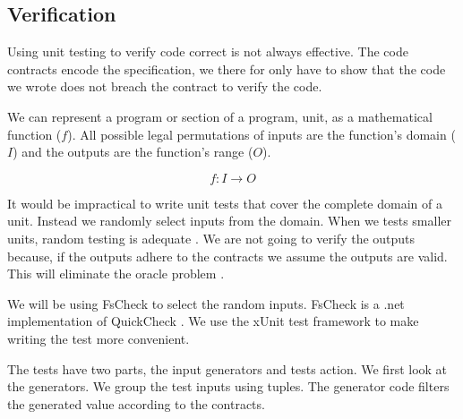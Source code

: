 \subsection{Verification}

Using unit testing to verify code correct is not always effective. The code contracts 
encode the specification, we there for only have to show that the code we wrote 
does not breach the contract to verify the code.

We can represent a program or section of a program, unit, as a mathematical function
(\(f\)). All possible legal permutations of inputs are the function's domain (\(I\)) and 
the outputs are the function's range (\(O\)).

\[ f: I \rightarrow O \]

It would be impractical to write unit tests that cover the complete domain
of a unit. Instead we randomly select inputs from the domain. When we tests smaller
units, random testing is adequate \parencite{Hamlet94randomtesting}.
We are not going to verify the outputs because,
if the outputs adhere to the contracts we assume the outputs are valid. This will 
eliminate the oracle problem \parencite{QuickCheck}\parencite{Hamlet94randomtesting}.

We will be using FsCheck to select the random inputs. FsCheck is a .net implementation
of QuickCheck \parencite{FsCheck_home}. We use the xUnit test framework to make
writing the test more convenient.

The tests have two parts, the input generators and tests action. We first look at the generators.
We group the test inputs using tuples. The generator code filters the generated value according
to the contracts.

\vspace{5mm} %

